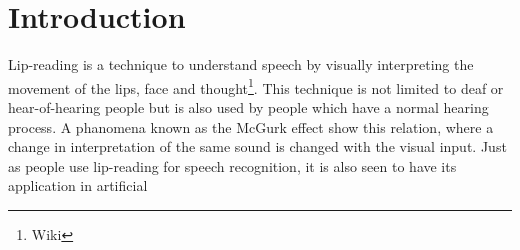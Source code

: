 \section{Introduction}
Lip-reading is a technique to understand speech by visually interpreting the movement of the lips, face and thought\footnote{Wiki}.
This technique is not limited to deaf or hear-of-hearing people but is also used by people which have a normal hearing process.
A phanomena known as the McGurk effect\cite{mcGurk} show this relation, where a change in interpretation of the same sound is changed with the visual input.
Just as people use lip-reading for speech recognition, it is also seen to have its application in artificial
